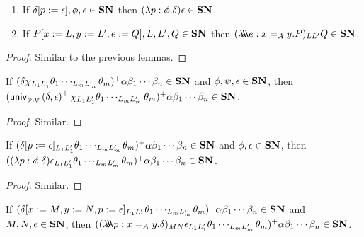 
\begin{lemma}
\label{lm:SNothers}
$ $
\begin{enumerate}
\item
If $\delta[p:=\epsilon], \phi, \epsilon \in \mathbf{SN}$ then $(\lambda p:\phi.\delta)\epsilon \in \mathbf{SN}$.
\item
If $P[x:=L, y:=L', e:=Q], L, L', Q \in \mathbf{SN}$ then $(\lambda \!\! \lambda \!\! \lambda e:x =_A y.P)_{L L'} Q \in \mathbf{SN}$.
\end{enumerate}
\end{lemma}

\begin{proof}
Similar to the previous lemmas.
\end{proof}

\begin{lemma}
\label{lm:wte_loi1}
If $(\delta \chi_{L_1 L_1'} \theta_1 \cdots_{L_m L_m'} \theta_m)^+ \alpha \beta_1 \cdots \beta_n \in \mathbf{SN}$ and $\phi, \psi, \epsilon \in \mathbf{SN}$, then
$(\mathsf{univ}_{{\phi} , {\psi}} \left( {\delta} , {\epsilon} \right)^+ \chi_{L_1 L_1'} \theta_1 \cdots_{L_m L_m'} \theta_m)^+ \alpha \beta_1 \cdots \beta_n \in \mathbf{SN}$.
\end{lemma}

\begin{proof}
Similar.
\end{proof}

\begin{lemma}
\label{lm:wte_loi2}
If $(\delta[p:=\epsilon]_{L_1 L_1'} \theta_1 \cdots_{L_m L_m'} \theta_m)^+ \alpha \beta_1 \cdots \beta_n \in \mathbf{SN}$ and $\phi, \epsilon \in \mathbf{SN}$, then
$((\lambda p:\phi.\delta) \epsilon_{L_1 L_1'} \theta_1 \cdots_{L_m L_m'} \theta_m)^+ \alpha \beta_1 \cdots \beta_n \in \mathbf{SN}$.
\end{lemma}

\begin{proof}
Similar.
\end{proof}

\begin{lemma}
\label{lm:wte_loi3}
If $(\delta[x:=M, y:=N, p:=\epsilon]_{L_1 L_1'} \theta_1 \cdots_{L_m L_m'} \theta_m)^+ \alpha \beta_1 \cdots \beta_n \in \mathbf{SN}$ and $M, N, \epsilon \in \mathbf{SN}$, then
$((\lambda \!\! \lambda \!\! \lambda p:x =_A y.\delta)_{MN} \epsilon_{L_1 L_1'} \theta_1 \cdots_{L_m L_m'} \theta_m)^+ \alpha \beta_1 \cdots \beta_n \in \mathbf{SN}$.
\end{lemma}

